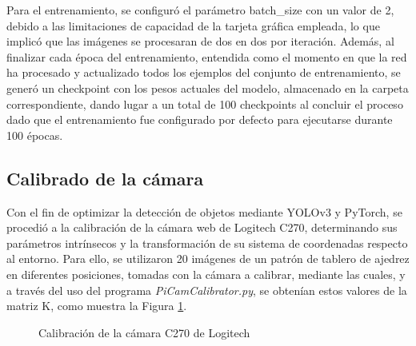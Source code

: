 Para el entrenamiento, se configuró el parámetro batch\_size con un valor de 2, debido a las limitaciones de capacidad de la tarjeta gráfica empleada, lo que implicó que las imágenes se procesaran de dos en dos por iteración. Además, al finalizar cada época del entrenamiento, entendida como el momento en que la red ha procesado y actualizado todos los ejemplos del conjunto de entrenamiento, se generó un checkpoint con los pesos actuales del modelo, almacenado en la carpeta correspondiente, dando lugar a un total de 100 checkpoints al concluir el proceso dado que el entrenamiento fue configurado por defecto para ejecutarse durante 100 épocas.

\subsection{Calibrado de la cámara}
\label{sec:Calibrado_camara}

Con el fin de optimizar la detección de objetos mediante YOLOv3 y PyTorch, se procedió a la calibración de la cámara web de Logitech C270, determinando sus parámetros intrínsecos y la transformación de su sistema de coordenadas respecto al entorno. Para ello, se utilizaron 20 imágenes de un patrón de tablero de ajedrez en diferentes posiciones, tomadas con la cámara a calibrar, mediante las cuales, y a través del uso del programa \textit{PiCamCalibrator.py}, se obtenían estos valores de la matriz K, como muestra la Figura \ref{fig:calibracion_camara}. 

 \begin{figure}[H]
    \begin{center}
      \subcapcentertrue
      \hspace{2mm}
    \end{center}
    \caption{Calibración de la cámara C270 de Logitech}
    \label{fig:calibracion_camara}
  \end{figure}

